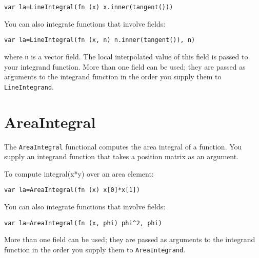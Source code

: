 \begin{lstlisting}
var la=LineIntegral(fn (x) x.inner(tangent()))
\end{lstlisting}

You can also integrate functions that involve fields:

\begin{lstlisting}
var la=LineIntegral(fn (x, n) n.inner(tangent()), n)
\end{lstlisting}

where \texttt{n} is a vector field. The local interpolated value of this
field is passed to your integrand function. More than one field can be
used; they are passed as arguments to the integrand function in the
order you supply them to \texttt{LineIntegrand}.

\hypertarget{areaintegral}{%
\section{AreaIntegral}\label{areaintegral}}

The \texttt{AreaIntegral} functional computes the area integral of a
function. You supply an integrand function that takes a position matrix
as an argument.

To compute integral(x*y) over an area element:

\begin{lstlisting}
var la=AreaIntegral(fn (x) x[0]*x[1])
\end{lstlisting}

You can also integrate functions that involve fields:

\begin{lstlisting}
var la=AreaIntegral(fn (x, phi) phi^2, phi)
\end{lstlisting}

More than one field can be used; they are passed as arguments to the
integrand function in the order you supply them to
\texttt{AreaIntegrand}.
